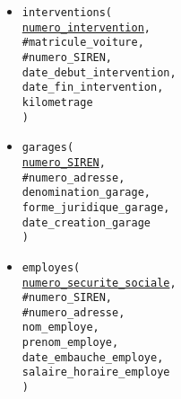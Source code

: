 \documentclass[a4paper,11pt]{article} %
\begin{document}
\begin{itemize}[leftmargin=*]
{        \#numero\_intervention, \\
        date\_devis, \\
        montant\_devis \\
    )}
    \item \texttt{interventions( \\
        \underline{numero\_intervention}, \\
        \#matricule\_voiture, \\
        \#numero\_SIREN, \\
        date\_debut\_intervention, \\
        date\_fin\_intervention, \\
        kilometrage \\
    )}
    \item \texttt{garages( \\
        \underline{numero\_SIREN}, \\
        \#numero\_adresse, \\
        denomination\_garage, \\
        forme\_juridique\_garage, \\
        date\_creation\_garage \\
    )}
    \item \texttt{employes( \\
        \underline{numero\_securite\_sociale}, \\
        \#numero\_SIREN, \\
        \#numero\_adresse, \\
        nom\_employe, \\
        prenom\_employe, \\
        date\_embauche\_employe, \\
        salaire\_horaire\_employe \\
    )}
\end{itemize}
\end{document}

